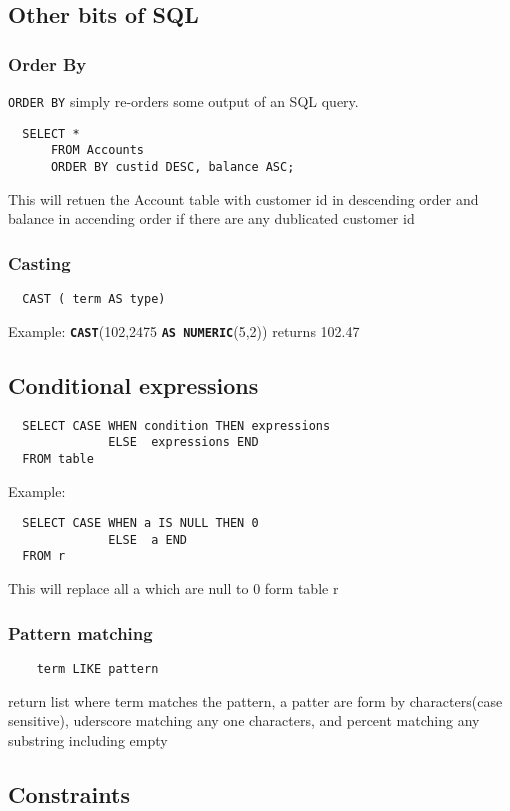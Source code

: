 \documentclass{article}
\begin{document}
\subsection{Other bits of SQL}
\subsubsection*{Order By}

\texttt{ORDER BY} simply re-orders some output of an SQL query.
\begin{lstlisting}
  SELECT *
      FROM Accounts
      ORDER BY custid DESC, balance ASC;
\end{lstlisting}
This will retuen the Account table with customer id in descending order and balance in accending order if there are any dublicated customer id

\subsubsection*{Casting}
\begin{lstlisting}
  CAST ( term AS type)
\end{lstlisting}
Example: \texttt{\textbf{CAST}}(102,2475 \texttt{\textbf{AS NUMERIC}}(5,2)) returns 102.47

\subsection*{Conditional expressions}
\begin{lstlisting}
  SELECT CASE WHEN condition THEN expressions
              ELSE  expressions END
  FROM table
\end{lstlisting}
Example:
\begin{lstlisting}
  SELECT CASE WHEN a IS NULL THEN 0
              ELSE  a END
  FROM r
\end{lstlisting}
This will replace all a which are null to 0 form table r

\subsubsection*{Pattern matching}
\begin{lstlisting}
    term LIKE pattern
  \end{lstlisting}
return list where term matches the pattern, a patter are form by characters(case sensitive), uderscore matching any one characters, and percent matching any substring including empty


\subsection{Constraints}
\end{document}
